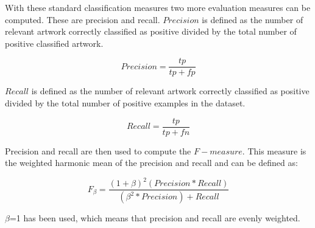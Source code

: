 With these standard classification measures two more evaluation measures can be computed.
These are precision and recall.
$Precision$ is defined as the number of relevant artwork correctly classified as positive divided by the total number of positive classified artwork.

\begin{equation}
Precision = \frac{tp}{tp + fp}
\end{equation}

$Recall$ is defined as the number of relevant artwork correctly classified as positive divided by the total number of positive examples in the dataset.

\begin{equation}
Recall = \frac{tp}{tp + fn}
\end{equation}

Precision and recall are then used to compute the $F-measure$.
This measure is the weighted harmonic mean of the precision and recall and can be defined as:

\begin{equation}
F_\beta = \frac{(1+\beta)^2 (Precision * Recall)}{(\beta ^2 * Precision) + Recall}
\end{equation}

$\beta$=1 has been used, which means that precision and recall are evenly weighted.